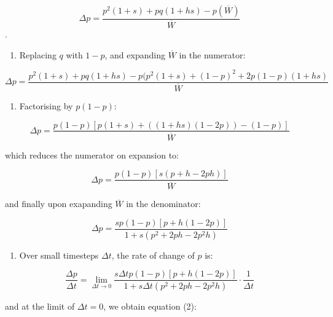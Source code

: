 \begin{equation} \Delta p = \frac{p^2(1+s) + pq(1+hs) - p(\overline{W})}{\overline{W}} \end{equation}.

\begin{enumerate}
\def\labelenumi{\arabic{enumi}.}
\setcounter{enumi}{2}
\tightlist
\item
  Replacing \(q\) with \(1-p\), and expanding \(\overline{W}\) in the
  numerator:
\end{enumerate}

\begin{equation} \Delta p = \frac{p^2(1+s) + pq(1+hs) - p(p^2(1+s) + (1-p)^2 + 2p(1-p)(1+hs)}{\overline{W}} \end{equation}

\begin{enumerate}
\def\labelenumi{\arabic{enumi}.}
\setcounter{enumi}{3}
\tightlist
\item
  Factorising by \(p(1-p)\):
\end{enumerate}

\begin{equation} \Delta p = \frac{p(1-p)[p(1+s) + ((1+hs)(1-2p)) - (1-p)]}{\overline{W}} \end{equation}

which reduces the numerator on expansion to:

\begin{equation} \Delta p = \frac{p(1-p)[s(p+h - 2ph)]}{\overline{W}} \end{equation}

and finally upon exapanding \(\overline{W}\) in the denominator:

\begin{equation} \Delta p = \frac{sp(1-p)[p+h(1-2p)]}{1 + s(p^2 + 2ph - 2p^2h)} \end{equation}

\begin{enumerate}
\def\labelenumi{\arabic{enumi}.}
\setcounter{enumi}{4}
\tightlist
\item
  Over small timesteps \(\Delta t\), the rate of change of \(p\) is:
\end{enumerate}

\begin{equation} \frac{\Delta p}{\Delta t} = \lim \limits_{\Delta t \to 0} \frac{s \Delta t p(1-p)[p+h(1-2p)]}{1 + s \Delta t (p^2 + 2ph - 2p^2h)} \cdot \frac{1}{\Delta t} \end{equation}

and at the limit of \(\Delta t = 0\), we obtain equation (2):

